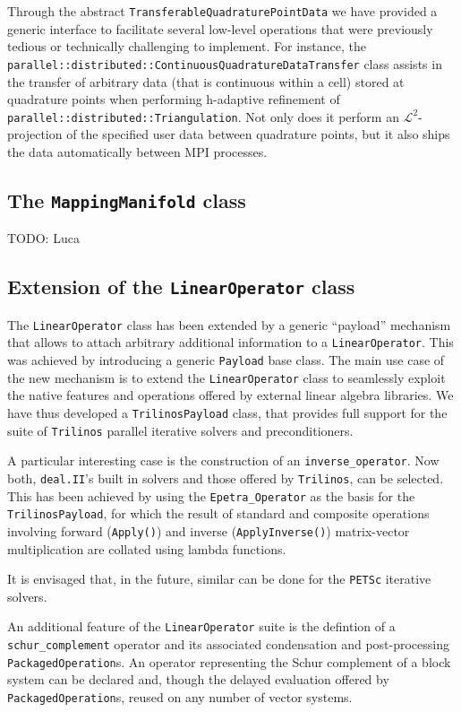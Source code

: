 \documentclass{ansarticle-preprint}
\newcommand{\specialword}[1]{\texttt{#1}}
\newcommand{\dealii}{{\specialword{deal.II}}}
\newcommand{\trilinos}{{\specialword{Trilinos}}}
\newcommand{\petsc}{\specialword{PETSc}}
\begin{document}
Through the abstract \texttt{TransferableQuadraturePointData} we have
provided a generic interface to facilitate several low-level operations
that were previously tedious or technically challenging to implement. For
instance, the
\texttt{parallel::distributed::ContinuousQuadratureDataTransfer} class
assists in the transfer of arbitrary data (that is continuous within a
cell) stored at quadrature points when performing h-adaptive refinement of
\texttt{parallel::distributed::Triangulation}. Not only does it perform an
$\mathcal{L}^2$-projection of the specified user data between quadrature
points, but it also ships the data automatically between MPI processes.

\subsection{The \texttt{MappingManifold} class}

TODO: Luca

\subsection{Extension of the \texttt{LinearOperator} class}

The \texttt{LinearOperator} class has been extended by a generic
``payload'' mechanism that allows to attach arbitrary additional
information to a \texttt{LinearOperator}. This was achieved by introducing
a generic \texttt{Payload} base class. The main use case of the new
mechanism is to extend the \texttt{LinearOperator} class to seamlessly
exploit the native features and operations offered by external linear
algebra libraries. We have thus developed a \texttt{TrilinosPayload} class,
that provides full support for the suite of {\trilinos} parallel iterative
solvers and preconditioners.

A particular interesting case is the construction of an
\texttt{inverse\_operator}. Now both, \dealii's built in solvers and those
offered by {\trilinos}, can be selected. This has been achieved by using
the \texttt{Epetra\_Operator} as the basis for the
\texttt{TrilinosPayload}, for which the result of standard and composite
operations involving forward (\texttt{Apply()}) and inverse
(\texttt{ApplyInverse()}) matrix-vector multiplication are collated using
lambda functions.

It is envisaged that, in the future, similar can be done for the {\petsc}
iterative solvers.

An additional feature of the \texttt{LinearOperator} suite is the defintion
of a \texttt{schur\_complement} operator and its associated condensation
and post-processing \texttt{PackagedOperation}s. An operator representing
the Schur complement of a block system can be declared and, though the
delayed evaluation offered by \texttt{PackagedOperation}s, reused on any
number of vector systems.
\end{document}
